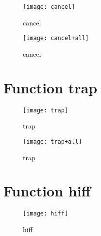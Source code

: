 \begin{figure}[h]
\begin{center}
\texttt{[image: cancel]}
\caption{cancel}
\end{center}
\end{figure}

\begin{figure}[h]
\begin{center}
\texttt{[image: cancel+all]}
\caption{cancel}
\end{center}
\end{figure}

\newpage

\section{Function trap}

\begin{center}

\end{center}

\begin{center}

\end{center}

\begin{figure}[h]
\begin{center}
\texttt{[image: trap]}
\caption{trap}
\end{center}
\end{figure}

\begin{figure}[h]
\begin{center}
\texttt{[image: trap+all]}
\caption{trap}
\end{center}
\end{figure}

\newpage

\section{Function hiff}

\begin{center}

\end{center}

\begin{center}

\end{center}

\begin{figure}[h]
\begin{center}
\texttt{[image: hiff]}
\caption{hiff}
\end{center}
\end{figure}

